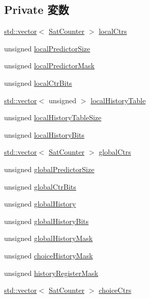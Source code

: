 \subsection*{Private 変数}
\begin{DoxyCompactItemize}
\item 
\hyperlink{classstd_1_1vector}{std::vector}$<$ \hyperlink{classSatCounter}{SatCounter} $>$ \hyperlink{classTournamentBP_a639a100e0452520604d19db58d98721d}{localCtrs}
\item 
unsigned \hyperlink{classTournamentBP_ad980634448337df2bf521bc96fd5653d}{localPredictorSize}
\item 
unsigned \hyperlink{classTournamentBP_a260a954fa701712cdc113f3f9d0fc9ee}{localPredictorMask}
\item 
unsigned \hyperlink{classTournamentBP_a815998927bcd79afe7f787b90f9954f5}{localCtrBits}
\item 
\hyperlink{classstd_1_1vector}{std::vector}$<$ unsigned $>$ \hyperlink{classTournamentBP_a0cd7dde45fcd92a2f25e895f8232007e}{localHistoryTable}
\item 
unsigned \hyperlink{classTournamentBP_a71759b087accf553cc72b42bbd20dacd}{localHistoryTableSize}
\item 
unsigned \hyperlink{classTournamentBP_affb9008b5a92be8b47d319a4ecc28683}{localHistoryBits}
\item 
\hyperlink{classstd_1_1vector}{std::vector}$<$ \hyperlink{classSatCounter}{SatCounter} $>$ \hyperlink{classTournamentBP_aa8fc28af97afce3a4f54e4924f7d4815}{globalCtrs}
\item 
unsigned \hyperlink{classTournamentBP_ad3a4f2fc3c100e6baa69ece70da3cc07}{globalPredictorSize}
\item 
unsigned \hyperlink{classTournamentBP_a21c0cae328ca40466ae7e247bd62373f}{globalCtrBits}
\item 
unsigned \hyperlink{classTournamentBP_a48805f17e95aa944cb6eda2fcf061adf}{globalHistory}
\item 
unsigned \hyperlink{classTournamentBP_a64788f44637c4acaa30edab60e940f1e}{globalHistoryBits}
\item 
unsigned \hyperlink{classTournamentBP_a8a8a42593ca0c54c9cea34315edaf5fa}{globalHistoryMask}
\item 
unsigned \hyperlink{classTournamentBP_aaaf50cc17f3cbe92a7d57a4f86c0cf5c}{choiceHistoryMask}
\item 
unsigned \hyperlink{classTournamentBP_acdbccf5f7c6840a7dd6cd9350d2d29c2}{historyRegisterMask}
\item 
\hyperlink{classstd_1_1vector}{std::vector}$<$ \hyperlink{classSatCounter}{SatCounter} $>$ \hyperlink{classTournamentBP_a26f80c7389224a73876e470b543e327a}{choiceCtrs}

\end{DoxyCompactItemize}
